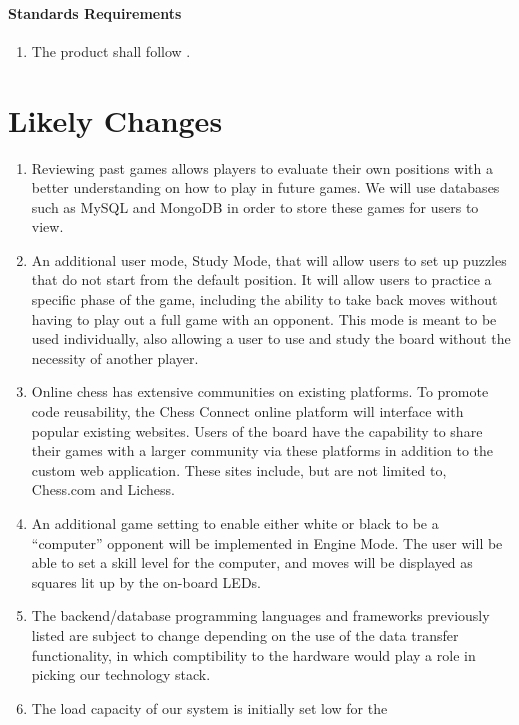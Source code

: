 \documentclass[12pt]{article}
\begin{document}
{\paragraph{Standards Requirements}
\begin{enumerate}[{LR}1., leftmargin=2\parindent, resume]
    \item The product shall follow \cite{WCAG2018}.
\end{enumerate}


\section{Likely Changes}
\noindent
\begin{enumerate}[{LC}1., leftmargin=2\parindent]
    \item Reviewing past games allows players to evaluate their own positions with a better understanding on how to play in future games.
    We will use databases such as MySQL and MongoDB in order to store these games for users to view.
    \item An additional user mode, Study Mode, that will allow users to set up puzzles that do not start from the default position.
    It will allow users to practice a specific phase of the game, including the ability to take back moves without having to play out a full game with an opponent. 
    This mode is meant to be used individually, also allowing a user to use and study the board without the necessity of another player.
    \item Online chess has extensive communities on existing platforms. To promote code reusability, the Chess Connect online platform will interface with popular existing websites.
    Users of the board have the capability to share their games with a larger community via these platforms in addition to the custom web application. These sites include, but are not limited to, Chess.com and Lichess.
    \item An additional game setting to enable either white or black to be a ``computer'' opponent will be implemented in Engine Mode. The user will be able to set a skill level
    for the computer, and moves will be displayed as squares lit up by the on-board LEDs.
    \item The backend/database programming languages and frameworks previously listed
    are subject to change depending on the use of the data transfer functionality, in which comptibility to the hardware would play a role
    in picking our technology stack.  
    \item The load capacity of our system is initially set low for the

\end{enumerate}}
\end{document}
